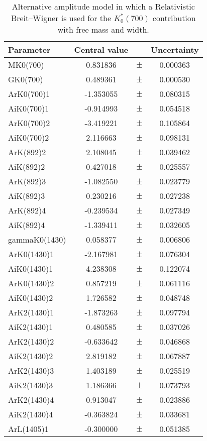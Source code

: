 \clearpage

\begin{table}
\centering
\caption{Alternative amplitude model in which a Relativistic Breit--Wigner is used for the $K^*_0(700)$ contribution with free mass and width.}
\begin{tiny}
\begin{tabular}{lccc}
\toprule
Parameter & Central value & & Uncertainty\\
\midrule
MK0(700) & 0.831836 & $\pm$ & 0.000363 \\
GK0(700) & 0.489361 & $\pm$ & 0.000530 \\
ArK0(700)1 & -1.353055 & $\pm$ & 0.080315 \\
AiK0(700)1 & -0.914993 & $\pm$ & 0.054518 \\
ArK0(700)2 & -3.419221 & $\pm$ & 0.105864 \\
AiK0(700)2 & 2.116663 & $\pm$ & 0.098131 \\
ArK(892)2 & 2.108045 & $\pm$ & 0.039462 \\
AiK(892)2 & 0.427018 & $\pm$ & 0.025557 \\
ArK(892)3 & -1.082550 & $\pm$ & 0.023779 \\
AiK(892)3 & 0.230216 & $\pm$ & 0.027238 \\
ArK(892)4 & -0.239534 & $\pm$ & 0.027349 \\
AiK(892)4 & -1.339411 & $\pm$ & 0.032605 \\
gammaK0(1430) & 0.058377 & $\pm$ & 0.006806 \\
ArK0(1430)1 & -2.167981 & $\pm$ & 0.076304 \\
AiK0(1430)1 & 4.238308 & $\pm$ & 0.122074 \\
ArK0(1430)2 & 0.857219 & $\pm$ & 0.061116 \\
AiK0(1430)2 & 1.726582 & $\pm$ & 0.048748 \\
ArK2(1430)1 & -1.873263 & $\pm$ & 0.097794 \\
AiK2(1430)1 & 0.480585 & $\pm$ & 0.037026 \\
ArK2(1430)2 & -0.633642 & $\pm$ & 0.046868 \\
AiK2(1430)2 & 2.819182 & $\pm$ & 0.067887 \\
ArK2(1430)3 & 1.403189 & $\pm$ & 0.025519 \\
AiK2(1430)3 & 1.186366 & $\pm$ & 0.073793 \\
ArK2(1430)4 & 0.913047 & $\pm$ & 0.023886 \\
AiK2(1430)4 & -0.363824 & $\pm$ & 0.033681 \\
ArL(1405)1 & -0.300000 & $\pm$ & 0.051385 \\

\end{tabular}
\end{tiny}
\end{table}
